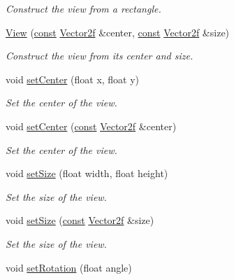 \begin{DoxyCompactItemize}
\begin{DoxyCompactList}\small\item\em Construct the view from a rectangle. \end{DoxyCompactList}\item 
\hyperlink{classsf_1_1_view_afdaf84cfc910ef160450d63603457ea4}{View} (\hyperlink{term__entry_8h_a57bd63ce7f9a353488880e3de6692d5a}{const} \hyperlink{namespacesf_a80cea3c46537294fd1d8d428566ad8b2}{Vector2f} \&center, \hyperlink{term__entry_8h_a57bd63ce7f9a353488880e3de6692d5a}{const} \hyperlink{namespacesf_a80cea3c46537294fd1d8d428566ad8b2}{Vector2f} \&size)
\begin{DoxyCompactList}\small\item\em Construct the view from its center and size. \end{DoxyCompactList}\item 
void \hyperlink{classsf_1_1_view_aa8e3fedb008306ff9811163545fb75f2}{set\-Center} (float x, float y)
\begin{DoxyCompactList}\small\item\em Set the center of the view. \end{DoxyCompactList}\item 
void \hyperlink{classsf_1_1_view_ab0296b03793e0873e6ae9e15311f3e78}{set\-Center} (\hyperlink{term__entry_8h_a57bd63ce7f9a353488880e3de6692d5a}{const} \hyperlink{namespacesf_a80cea3c46537294fd1d8d428566ad8b2}{Vector2f} \&center)
\begin{DoxyCompactList}\small\item\em Set the center of the view. \end{DoxyCompactList}\item 
void \hyperlink{classsf_1_1_view_a9525b73fe9fbaceb9568faf56b399dab}{set\-Size} (float width, float height)
\begin{DoxyCompactList}\small\item\em Set the size of the view. \end{DoxyCompactList}\item 
void \hyperlink{classsf_1_1_view_a9e08d471ce21aa0e69ce55ff9de66d29}{set\-Size} (\hyperlink{term__entry_8h_a57bd63ce7f9a353488880e3de6692d5a}{const} \hyperlink{namespacesf_a80cea3c46537294fd1d8d428566ad8b2}{Vector2f} \&size)
\begin{DoxyCompactList}\small\item\em Set the size of the view. \end{DoxyCompactList}\item 
void \hyperlink{classsf_1_1_view_a24d0503c9c51f5ef5918612786d325c1}{set\-Rotation} (float angle)

\end{DoxyCompactItemize}
